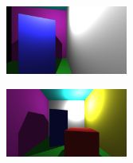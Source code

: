\documentclass[a4]{article}
\begin{document}
\begin{figure}[H]
    \centering
    \begin{minipage}{.5\textwidth}
        \centering
        \includegraphics[width=4cm]{720ani2.png}
        \label{fig:camera}
    \end{minipage}%
    \begin{minipage}{.5\textwidth}
        \centering
        \includegraphics[width=4cm]{light2.png}
        \label{fig:light}
    \end{minipage}
\end{figure}
\end{document}
